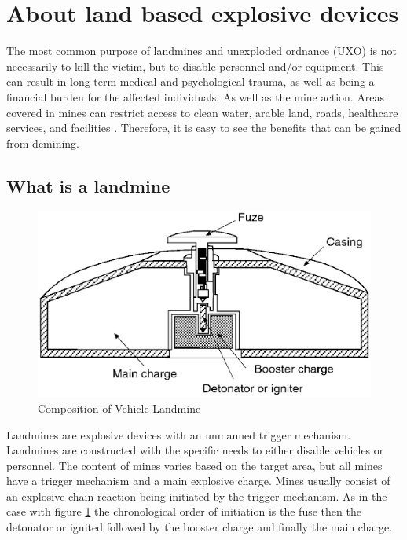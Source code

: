 \section{About land based explosive devices}\label{mas_23}

The most common purpose of landmines and unexploded ordnance (UXO) is not necessarily to kill the victim, but to disable personnel and/or equipment. This can result in long-term medical and psychological trauma, as well as being a financial burden for the affected individuals. As well as the mine action. \cite{LandmineMonitor2019} Areas covered in mines can restrict access to clean water, arable land, roads, healthcare services, and facilities \cite{OxfordAcademic2005}. Therefore, it is easy to see the benefits that can be gained from demining. 

\subsection{What is a landmine}

\begin{figure}
\vspace{-8mm}
\centering
\includegraphics[width=\linewidth]{00 - Images/composition of vehicle landmine.png}
  \caption{Composition of Vehicle Landmine \cite{NAP10071}}
  \label{fig:comp_veh_mine}
\end{figure}

Landmines are explosive devices with an unmanned trigger mechanism. Landmines are constructed with the specific needs to either disable vehicles or personnel. The content of mines varies based on the target area, but all mines have a trigger mechanism and a main explosive charge. Mines usually consist of an explosive chain reaction being initiated by the trigger mechanism. As in the case with figure \ref{fig:comp_veh_mine} the chronological order of initiation is the fuse then the detonator or ignited followed by the booster charge and finally the main charge. \cite{NAP10071}

